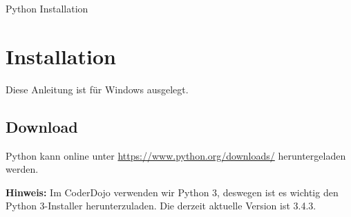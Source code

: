 \documentclass[ngerman,oneside, a4letter]{article}
\begin{document}
{\huge Python Installation}

\section{Installation}
Diese Anleitung ist für Windows ausgelegt.

\subsection{Download}
Python kann online unter \url{https://www.python.org/downloads/} heruntergeladen werden.
\\

\begin{center}
\end{center}
\textbf{Hinweis:} Im CoderDojo verwenden wir Python 3, deswegen ist es wichtig den Python 3-Installer herunterzuladen. Die derzeit aktuelle Version ist 3.4.3.

\clearpage
\end{document}
